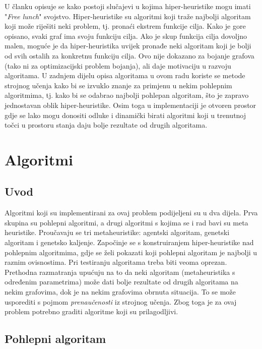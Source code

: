 \documentclass[times, utf8, diplomski, numeric]{fer}
\begin{document}
U članku \cite{conf/eurogp/PoliG09} opisuje se kako postoji slučajevi u kojima hiper-heuristike mogu imati "\emph{Free lunch}" svojstvo. Hiper-heuristike su algoritmi koji traže najbolji algoritam koji može riješiti neki problem, tj. pronaći ekstrem funkcije cilja. Kako je gore opisano, svaki graf ima svoju funkciju cilja. Ako je skup funkcija cilja dovoljno malen, moguće je da hiper-heuristika uvijek pronađe neki algoritam koji je bolji od svih ostalih za konkretnu funkciju cilja. Ovo nije dokazano za bojanje grafova (tako ni za optimizacijski problem bojanja), ali daje motivaciju u razvoju algoritama. U zadnjem dijelu opisa algoritama u ovom radu koriste se metode strojnog učenja kako bi se izvuklo znanje za primjenu u nekim pohlepnim algoritmima, tj. kako bi se odabrao najbolji pohlepan algoritam, što je zapravo jednostavan oblik hiper-heuristike. Osim toga u implementaciji je otvoren prostor gdje se lako mogu donositi odluke i dinamički birati algoritmi koji u trenutnoj točci u prostoru stanja daju bolje rezultate od drugih algoritama.

\chapter{Algoritmi}

\section{Uvod}

Algoritmi koji su implementirani za ovaj problem podijeljeni su u dva dijela. Prva skupina su pohlepni algoritmi, a drugi algoritmi s kojima se i rad bavi su meta heuristike. Proučavaju se tri metaheuristike: agentski algoritam, genetski algoritam i genetsko kaljenje. Započinje se s konstruiranjem hiper-heuristike nad pohlepnim algoritmima, gdje se želi pokazati koji pohlepni algoritam je najbolji u raznim ovisnostima. Pri testiranju algoritama treba biti veoma oprezan. Prethodna razmatranja upućuju na to da neki algoritam (metaheuristika s određenim parametrima) može dati bolje rezultate od drugih algoritama na nekim grafovima, dok je na nekim grafovima obrnuta situacija. To se može usporediti s pojmom \emph{prenaučenosti} iz strojnog učenja. Zbog toga je za ovaj problem potrebno graditi algoritme koji su prilagodljivi.

\section{Pohlepni algoritam}
\end{document}
